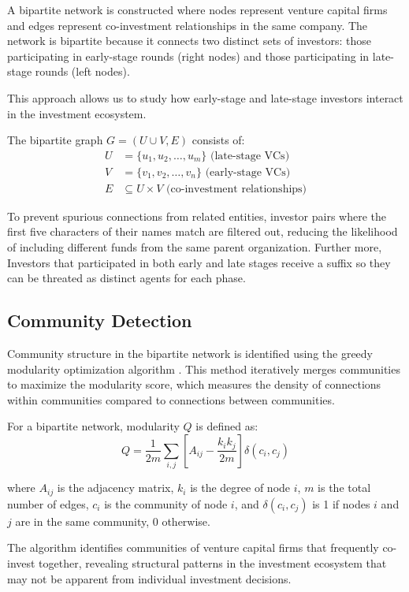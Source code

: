 \documentclass[12pt]{article}
\begin{document}
A bipartite network is constructed where nodes represent venture capital firms and edges represent co-investment relationships in the same company. The network is bipartite because it connects two distinct sets of investors: those participating in early-stage rounds (right nodes) and those participating in late-stage rounds (left nodes).

This approach allows us to study how early-stage and late-stage investors interact in the investment ecosystem.

The bipartite graph $G = (U \cup V, E)$ consists of:
\begin{align}
U &= \{u_1, u_2, \ldots, u_m\} \text{ (late-stage VCs)} \\
V &= \{v_1, v_2, \ldots, v_n\} \text{ (early-stage VCs)} \\
E &\subseteq U \times V \text{ (co-investment relationships)}
\end{align}

To prevent spurious connections from related entities, investor pairs where the first five characters of their names match are filtered out, reducing the likelihood of including different funds from the same parent organization. Further more,  Investors that participated in both early and late stages receive a suffix so they can be threated as distinct agents for each phase.

\subsection{Community Detection}

Community structure in the bipartite network is identified using the greedy modularity optimization algorithm \cite{Borgatti2011}. This method iteratively merges communities to maximize the modularity score, which measures the density of connections within communities compared to connections between communities.

For a bipartite network, modularity $Q$ is defined as:
\begin{equation}
Q = \frac{1}{2m} \sum_{i,j} \left[ A_{ij} - \frac{k_i k_j}{2m} \right] \delta(c_i, c_j)
\end{equation}

where $A_{ij}$ is the adjacency matrix, $k_i$ is the degree of node $i$, $m$ is the total number of edges, $c_i$ is the community of node $i$, and $\delta(c_i, c_j)$ is 1 if nodes $i$ and $j$ are in the same community, 0 otherwise.

The algorithm identifies communities of venture capital firms that frequently co-invest together, revealing structural patterns in the investment ecosystem that may not be apparent from individual investment decisions.
\end{document}
